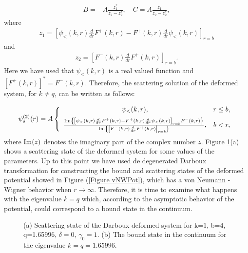 \documentclass[a4paper]{jpconf}
\begin{document}
\begin{eqnarray*}
B=-A \frac{z_{1}^{*}}{z_{2}-z_{2}^{*}},\quad C=A \frac{z_{1}}{z_{2}-z_{2}^{*}},
\end{eqnarray*}
where
\begin{eqnarray*}
z_{1}=\left[\psi_{<}(k,r)\frac{d}{dr}F^{+}(k,r)-F^{+}(k,r)\frac{d}{dr}\psi_{<}(k,r)\right]_{r=b}
\end{eqnarray*}
and
\begin{eqnarray*}
z_{2}=\left[F^{-}(k,r)\frac{d}{dr}F^{+}(k,r)\right]_{r=b}.
\end{eqnarray*}
Here we have used that $\psi_{<}(k,r)$ is a real valued function and $[F^{+}(k,r)]^{*}=F^{-}(k,r)$. Therefore, the scattering solution of the deformed system, for $k\neq q$, can be written as follows:

\begin{eqnarray}
\psi_{s}^{(2)}(r)=A\left\{
\begin{array}{cc}
 \psi_{<}(k,r), & r\leq b,  \\[0.2cm]
\frac{{\rm Im}\left\{\left[ \psi_{<}(k,r)\frac{d}{dr}F^{+}(k,r)-F^{+}(k,r)\frac{d}{dr} \psi_{<}(k,r)\right]_{r=b}F^{-}(k,r)\right\}}{{\rm Im}\left\{\left[F^{-}(k,r)\frac{d}{dr}F^{+}(k,r)\right]_{r=b}\right\}},&b<r, \label{DD-ScatteringStates}
\end{array}
\right.
\end{eqnarray} 
where  ${\rm Im}(z)$ denotes the imaginary part of the complex number $z$. Figure \ref{LastFigure}(a) shows a scattering state of the deformed system for some values of the parameters. Up to this point we have used de degenerated Darboux transformation for constructing the bound and scattering states of the deformed potential showed in Figure (\ref{Figure vNWPot}), which has a von Neumann - Wigner behavior when $r\rightarrow \infty$. Therefore, it is time to examine what happens with the eigenvalue $k=q$ which, according to the asymptotic behavior of the potential, could correspond to a bound state in the continuum.  

\begin{figure}
\centering
{}%
\hfill%
%
\caption{\label{LastFigure} (a) Scattering state of the Darboux deformed system for k=1, b=4, q=1.65996, $\delta=0$, $\gamma_0=1$. (b) The bound state in the continuum for the eigenvalue $k=q=1.65996$.}
\end{figure}
\end{document}
